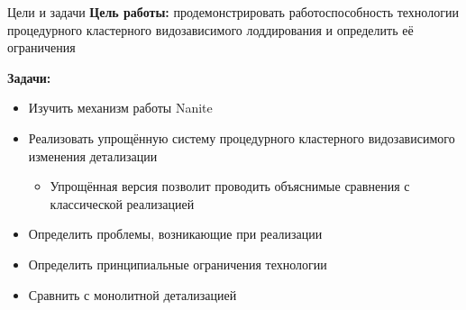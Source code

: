 \begin{frame}{Цели и задачи}
    \textbf{Цель работы:}
    продемонстрировать работоспособность технологии процедурного кластерного видозависимого лоддирования и определить её ограничения

    \bigskip

    \textbf{Задачи:}
    \begin{itemize}
        \item Изучить механизм работы Nanite
        \item Реализовать упрощённую систему процедурного кластерного видозависимого изменения детализации
        \begin{itemize}
            \item Упрощённая версия позволит проводить объяснимые сравнения с классической реализацией
        \end{itemize}
        \item Определить проблемы, возникающие при реализации
        \item Определить принципиальные ограничения технологии
        \item Сравнить с монолитной детализацией
    \end{itemize}
\end{frame}

